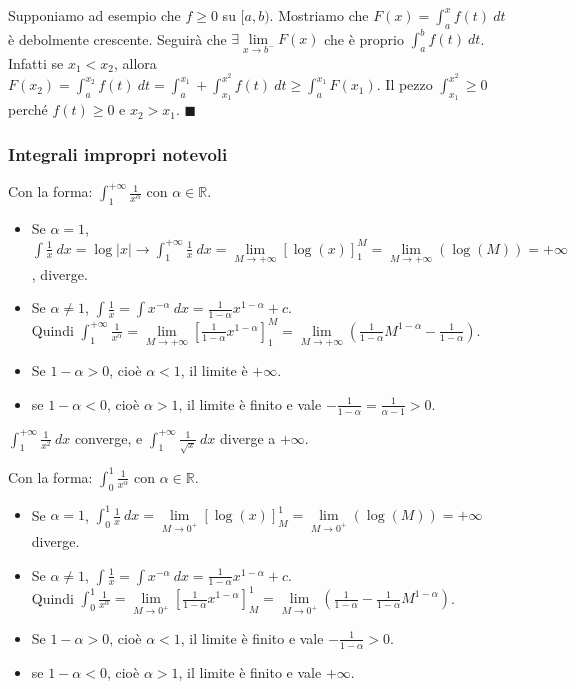\begin{demostration}
Supponiamo ad esempio che $f\geq 0$ su $[a,b)$. Mostriamo che $F(x) = \int_a^x f(t)\:dt$ è debolmente crescente. Seguirà che $\exists \lim\limits_{x\to b^-}F(x)$ che è proprio $\int_a^b f(t)\:dt$. Infatti se $x_1 < x_2$, allora $F(x_2) = \int_a^{x_2}f(t)\:dt = \int_a^{x_1} + \int_{x_1}^{x^2}f(t)\:dt \geq \int_a^{x_1}F(x_1)$.
Il pezzo $\int_{x_1}^{x^2} \geq 0$ perché $f(t) \geq 0$ e $x_2 > x_1$. $\blacksquare$
\end{demostration}

\subsubsection{Integrali impropri notevoli}
Con la forma: $\int_1^{+\infty}\frac{1}{x^{\alpha}}$ con $\alpha \in \mathbb{R}$.
\begin{itemize}
    \item Se $\alpha = 1$, $\int \frac{1}{x}\:dx = \log|x| \longrightarrow \int_1^{+\infty}\frac{1}{x}\:dx = \lim\limits_{M\to +\infty}[\log(x)]_1^M = \lim\limits_{M\to +\infty}(\log(M)) = +\infty$, diverge.
    \item Se $\alpha \neq 1$, $\int \frac{1}{x} = \int x^{-\alpha}\:dx = \frac{1}{1-\alpha}x^{1-\alpha} + c$.\\
    Quindi $\int_1^{+\infty}\frac{1}{x^{\alpha}} = \lim\limits_{M\to +\infty} [\frac{1}{1-\alpha}x^{1-\alpha}]_1^M = \lim\limits_{M\to +\infty} (\frac{1}{1-\alpha}M^{1-\alpha} - \frac{1}{1-\alpha})$.
    \item Se $1-\alpha > 0$, cioè $\alpha < 1$, il limite è $+\infty$.
    \item se $1-\alpha < 0$, cioè $\alpha > 1$, il limite è finito e vale $-\frac{1}{1-\alpha} = \frac{1}{\alpha-1}>0$.
\end{itemize}

\begin{example}
$\int_1^{+\infty}\frac{1}{x^2}\:dx$ converge, e $\int_1^{+\infty}\frac{1}{\sqrt{x}}\:dx$ diverge a $+\infty$.
\end{example}

\hspace{-15pt}Con la forma: $\int_0^1\frac{1}{x^{\alpha}}$ con $\alpha \in \mathbb{R}$.
\begin{itemize}
    \item Se $\alpha = 1$, $\int_0^{1}\frac{1}{x}\:dx = \lim\limits_{M\to 0^+}[\log(x)]_M^1 = \lim\limits_{M\to 0^+}(\log(M)) = +\infty$ diverge.
    \item Se $\alpha \neq 1$, $\int \frac{1}{x} = \int x^{-\alpha}\:dx = \frac{1}{1-\alpha}x^{1-\alpha} + c$.\\
    Quindi $\int_0^1\frac{1}{x^{\alpha}} = \lim\limits_{M\to 0^+} [\frac{1}{1-\alpha}x^{1-\alpha}]_M^1 = \lim\limits_{M\to 0^+} (\frac{1}{1-\alpha} - \frac{1}{1-\alpha}M^{1-\alpha})$.
    \item Se $1-\alpha > 0$, cioè $\alpha < 1$, il limite è finito e vale $-\frac{1}{1-\alpha} >0$.
    \item se $1-\alpha < 0$, cioè $\alpha > 1$, il limite è finito e vale $+\infty$.
\end{itemize}

